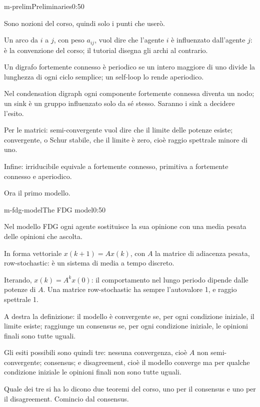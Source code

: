 \begin{slide}{m-prelim}{Preliminaries}{0:50}
  \begin{discorso}
    \item Sono nozioni del corso, quindi solo i punti che userò.
    \item Un arco da $i$ a $j$, con peso $a_{ij}$, vuol dire che l'agente $i$ è influenzato dall'agente $j$: è la convenzione del corso; il tutorial disegna gli archi al contrario.
    \item Un digrafo fortemente connesso è periodico se un intero maggiore di uno divide la lunghezza di ogni ciclo semplice; un self-loop lo rende aperiodico.
    \item Nel condensation digraph ogni componente fortemente connessa diventa un nodo; un sink è un gruppo influenzato solo da sé stesso. Saranno i sink a decidere l'esito.
    \item Per le matrici: semi-convergente vuol dire che il limite delle potenze esiste; convergente, o Schur stabile, che il limite è zero, cioè raggio spettrale minore di uno.
    \item Infine: irriducibile equivale a fortemente connesso, primitiva a fortemente connesso e aperiodico.
    \item Ora il primo modello.
  \end{discorso}
\end{slide}

\begin{slide}{m-fdg-model}{The FDG model}{0:50}
  \begin{discorso}
    \item Nel modello FDG ogni agente sostituisce la sua opinione con una media pesata delle opinioni che ascolta.
    \item In forma vettoriale $x(k+1)=Ax(k)$, con $A$ la matrice di adiacenza pesata, row-stochastic: è un sistema di media a tempo discreto.
    \item Iterando, $x(k)=A^kx(0)$: il comportamento nel lungo periodo dipende dalle potenze di $A$. Una matrice row-stochastic ha sempre l'autovalore 1, e raggio spettrale 1.
    \item A destra la definizione: il modello è convergente se, per ogni condizione iniziale, il limite esiste; raggiunge un consensus se, per ogni condizione iniziale, le opinioni finali sono tutte uguali.
    \item Gli esiti possibili sono quindi tre: nessuna convergenza, cioè $A$ non semi-convergente; consensus; e disagreement, cioè il modello converge ma per qualche condizione iniziale le opinioni finali non sono tutte uguali.
    \item Quale dei tre si ha lo dicono due teoremi del corso, uno per il consensus e uno per il disagreement. Comincio dal consensus.
  \end{discorso}
\end{slide}

